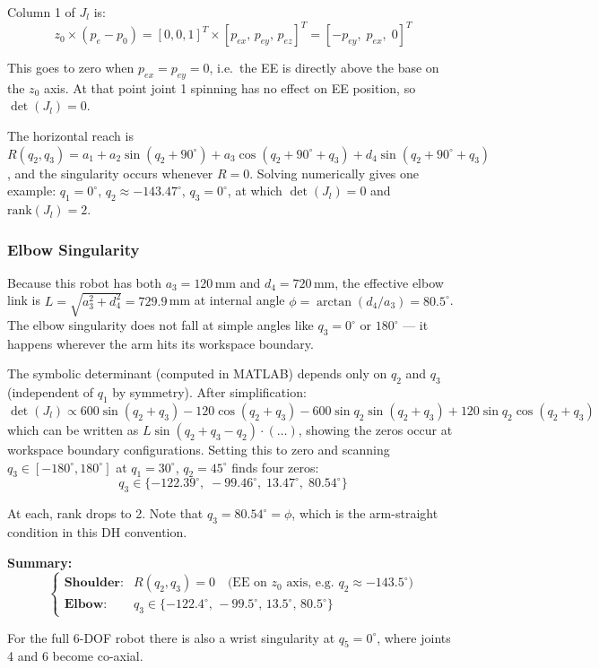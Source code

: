 \documentclass[12pt]{article}
\begin{document}
Column 1 of $J_l$ is:
\[
z_0 \times (p_e - p_0) = [0,0,1]^T \times [p_{ex},\,p_{ey},\,p_{ez}]^T
= [-p_{ey},\;p_{ex},\;0]^T
\]

This goes to zero when $p_{ex} = p_{ey} = 0$, i.e.\ the EE is
directly above the base on the $z_0$ axis. At that point joint 1
spinning has no effect on EE position, so $\det(J_l) = 0$.

The horizontal reach is $R(q_2,q_3) = a_1 + a_2\sin(q_2+90^\circ)
+ a_3\cos(q_2+90^\circ+q_3) + d_4\sin(q_2+90^\circ+q_3)$, and
the singularity occurs whenever $R=0$. Solving numerically gives
one example: $q_1=0^\circ$, $q_2\approx-143.47^\circ$, $q_3=0^\circ$,
at which $\det(J_l)=0$ and $\mathrm{rank}(J_l)=2$.

\subsubsection*{Elbow Singularity}

Because this robot has both $a_3=120$\,mm and $d_4=720$\,mm, the
effective elbow link is $L=\sqrt{a_3^2+d_4^2}=729.9$\,mm at
internal angle $\phi=\arctan(d_4/a_3)=80.5^\circ$. The elbow
singularity does not fall at simple angles like $q_3=0^\circ$ or
$180^\circ$ — it happens wherever the arm hits its workspace boundary.

The symbolic determinant (computed in MATLAB) depends only on $q_2$
and $q_3$ (independent of $q_1$ by symmetry). After simplification:
\[
\det(J_l) \propto
600\sin(q_2+q_3) - 120\cos(q_2+q_3) - 600\sin q_2\sin(q_2+q_3)
+ 120\sin q_2\cos(q_2+q_3)
\]
which can be written as $L\sin(q_2+q_3-q_2) \cdot (\ldots)$, showing
the zeros occur at workspace boundary configurations. Setting this to
zero and scanning $q_3\in[-180^\circ,180^\circ]$ at $q_1=30^\circ$,
$q_2=45^\circ$ finds four zeros:
\[
q_3 \in \{-122.39^\circ,\;-99.46^\circ,\;13.47^\circ,\;80.54^\circ\}
\]

At each, rank drops to 2. Note that $q_3=80.54^\circ=\phi$, which
is the arm-straight condition in this DH convention.

\textbf{Summary:}
\[
\begin{cases}
\textbf{Shoulder:} & R(q_2,q_3) = 0
  \quad\text{(EE on } z_0\text{ axis, e.g.\ } q_2\approx-143.5^\circ) \\[4pt]
\textbf{Elbow:}    & q_3 \in \{-122.4^\circ,\,-99.5^\circ,\,13.5^\circ,\,80.5^\circ\}
\end{cases}
\]

For the full 6-DOF robot there is also a wrist singularity at
$q_5=0^\circ$, where joints 4 and 6 become co-axial.
\end{document}

